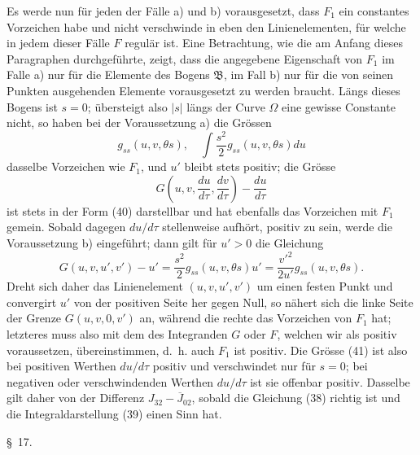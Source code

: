 \documentclass[11pt,a4paper,leqno]{article}
\begin{document}
Es werde nun für jeden der Fälle a) und b) vorausgesetzt, dass $F_1$ ein constantes Vorzeichen habe und nicht verschwinde in eben den Linienelementen, für welche in jedem dieser Fälle $F$ regulär ist. Eine Betrachtung, wie die am Anfang dieses Paragraphen durchgeführte, zeigt, dass die angegebene Eigenschaft von $F_1$ im Falle a) nur für die Elemente des Bogens $\mathfrak{B}$, im Fall b) nur für die von seinen Punkten ausgehenden Elemente vorausgesetzt zu werden braucht. Längs dieses Bogens ist $s=0$; übersteigt also $|s|$ längs der Curve $\Omega$ eine gewisse Constante nicht, so haben bei der Voraussetzung a) die Grössen
\[
g_{ss}(u,v,\theta s),
\quad \int\frac{s^2}{2}g_{ss}(u,v,\theta s)du
\]
dasselbe Vorzeichen wie $F_1$, und $u'$ bleibt stets positiv; die Grösse
\begin{equation}\tag{41}
G\left(u,v,\frac{du}{d\tau},\frac{dv}{d\tau}\right)-\frac{du}{d\tau}
\end{equation}
ist stets in der Form (40) darstellbar und hat ebenfalls das Vorzeichen mit $F_1$ gemein. Sobald dagegen $du/d\tau$ stellenweise aufhört, positiv zu sein, werde die Voraussetzung b) eingeführt; dann gilt für $u'>0$ die Gleichung
\[
G(u,v,u',v')-u'=\frac{s^2}{2}g_{ss}(u,v,\theta s)u'
=\frac{v'^2}{2u'}g_{ss}(u,v,\theta s).
\]
Dreht sich daher das Linienelement $(u,v,u',v')$ um einen festen Punkt und convergirt $u'$ von der positiven Seite her gegen Null, so nähert sich die linke Seite der Grenze $G(u,v,0,v')$ an, während die rechte das Vorzeichen von $F_1$ hat; letzteres muss
also mit dem des Integranden $G$ oder $F$, welchen wir als positiv voraussetzen, übereinstimmen, d.~h. auch $F_1$ ist positiv. Die Grösse (41) ist also bei positiven Werthen $du/d\tau$ positiv und verschwindet nur für $s=0$; bei negativen oder verschwindenden Werthen $du/d\tau$ ist sie offenbar positiv. Dasselbe gilt daher von der Differenz $J_{32}-\overline{J}_{02}$, sobald die Gleichung (38) richtig ist und die Integraldarstellung (39) einen Sinn hat.

\begin{center}{\large \S~17.}\end{center}
\end{document}
